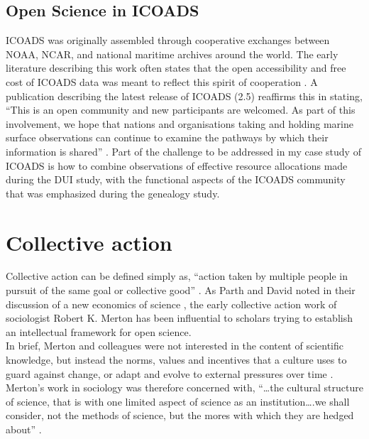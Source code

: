 \documentclass[thesis,tocnosub,noragright,centerchapter,12pt]{uiucecethesis09}
\begin{document}
\subsection*{Open Science in ICOADS}

ICOADS was originally assembled through cooperative exchanges between NOAA, NCAR, and national
maritime archives around the world. The early literature describing this work often states
that the open accessibility and free cost of ICOADS data was meant to reflect
this spirit of cooperation \citep{slutz1985comprehensive}. A publication
describing the latest release of ICOADS (2.5) reaffirms this in stating,
``This is an open community and new participants are welcomed. As part
of this involvement, we hope that nations and organisations taking and
holding marine surface observations can continue to examine the pathways
by which their information is shared'' \citep{woodruff2011icoads}. Part of the challenge to be addressed in my case study of ICOADS is how to combine observations of effective resource allocations made during the DUI study, with the functional aspects of the ICOADS community that was emphasized during the genealogy study.\\

\section{Collective action}

Collective action can be defined simply as, ``action taken by multiple
people in pursuit of the same goal or collective good''
\citep{oliver1993critical}. As Parth and David noted in their discussion
of a new economics of science \citeyear{partha1994toward}, the early collective action work of
sociologist Robert K. Merton has been influential to scholars trying to
establish an intellectual framework for open science.\\

In brief,  Merton and colleagues were not interested in the content of scientific
knowledge, but instead the norms, values and incentives that a culture
uses to guard against change, or adapt and
evolve to external pressures over time \citep{hess1997science}. Merton's work in sociology was therefore concerned with, ``\ldots{}the
cultural structure of science, that is with one limited aspect of
science as an institution\ldots{}.we shall consider, not the methods of
science, but the mores with which they are hedged about'' \citeyearpar[p. 268]{merton1973sociology}.\\
\end{document}
